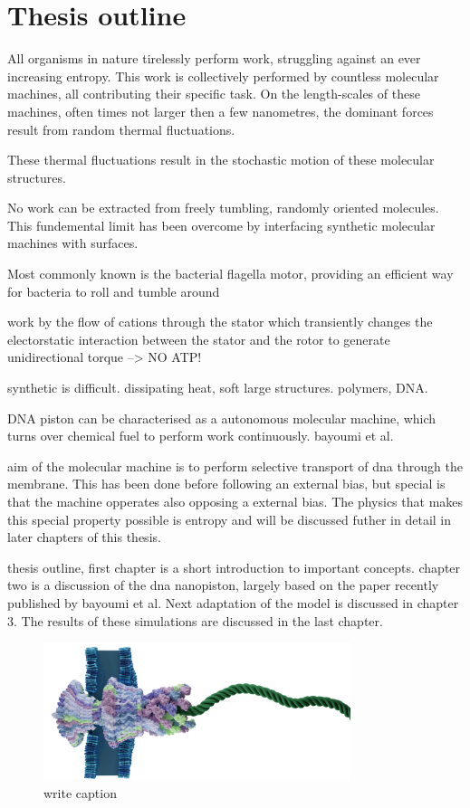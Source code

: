 \section{Thesis outline}

All organisms in nature tirelessly perform work, struggling against an ever increasing
entropy.  This work is collectively performed by countless
molecular machines, all contributing their specific task. On the length-scales of these
machines, often times not larger then a few nanometres, the dominant forces result from
random thermal fluctuations.

These thermal fluctuations result in the stochastic motion of these
molecular structures.


No work can be extracted from
freely tumbling, randomly oriented molecules.  This
fundemental limit has been overcome by interfacing synthetic molecular machines
with surfaces.

Most commonly known is the bacterial flagella motor, providing an efficient way for
bacteria to roll and tumble around


work by the flow of cations through the stator
which transiently changes the electorstatic interaction between the stator and the rotor
to generate unidirectional torque --> NO ATP!

synthetic is difficult. dissipating heat, soft large structures.  polymers, DNA.

DNA piston can be characterised as a autonomous molecular machine, which turns
over chemical fuel to perform work continuously. bayoumi et al.

aim of the molecular machine is to perform selective transport of dna through the
membrane. This has been done before following an external bias, but special is that the
machine opperates also opposing a external bias. The physics that makes this special
property possible is entropy and will be discussed futher in detail in later chapters of
this thesis.

thesis outline, first chapter is a short introduction to important concepts. chapter two
is a discussion of the dna nanopiston, largely based on the paper recently published by
bayoumi et al. Next adaptation of the model is discussed in chapter 3. The results of
these simulations are discussed in the last chapter.

\begin{figure}
\begin{center}
  \includegraphics[width=0.80\textwidth]{Figures/flagella.png}
  \caption{write caption}
\end{center}
\end{figure}
